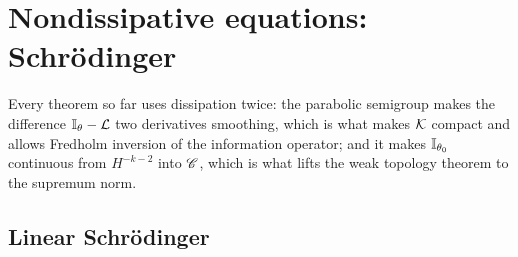 \section{Nondissipative equations: Schr\"odinger}\label{m:sec:nondiss}

Every theorem so far uses dissipation twice: the parabolic semigroup makes the difference $\mathbb{I}_\theta-\mathcal{L}$ two derivatives smoothing, which is what makes $\mathcal{K}$ compact and allows Fredholm inversion of the information operator; and it makes $\mathbb{I}_{\theta_0}$ continuous from $H^{-k-2}$ into $\mathscr{C}$, which is what lifts the weak topology theorem to the supremum norm.

\subsection{Linear Schr\"odinger}


